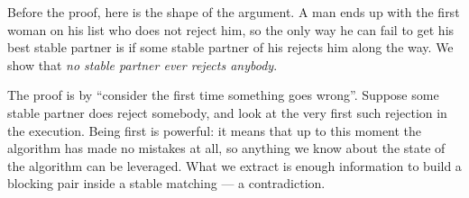 \begin{intuition}
Before the proof, here is the shape of the argument. A man ends up with the
first woman on his list who does not reject him, so the only way he can fail
to get his best stable partner is if some stable partner of his rejects him
along the way. We show that \emph{no stable partner ever rejects anybody}.

The proof is by ``consider the first time something goes wrong''. Suppose some
stable partner does reject somebody, and look at the very first such rejection
in the execution. Being first is powerful: it means that up to this moment the
algorithm has made no mistakes at all, so anything we know about the state of
the algorithm can be leveraged. What we extract is enough information to build
a blocking pair inside a stable matching --- a contradiction.
\end{intuition}

